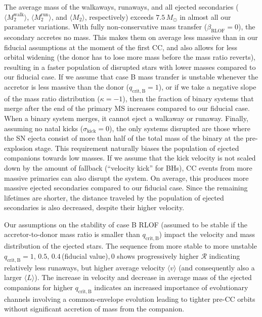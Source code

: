 \documentclass{aa}
\begin{document}
The average mass of the walkaways, runaways, and all ejected
secondaries ($\langle M_2^\mathrm{walk} \rangle$, $\langle
M_2^\mathrm{run} \rangle$, and $\langle M_2 \rangle$, respectively) exceeds $7.5\,M_\odot$ in almost all our parameter variations. With
fully non-conservative mass transfer ($\beta_\mathrm{RLOF}=0$),
the secondary accretes no mass. This makes them on average less
massive than in our fiducial assumptions at the moment of the first CC, and also allows
for less orbital widening (the donor has to lose more mass before the
mass ratio reverts), resulting in a faster population of disrupted
stars with lower masses compared to our fiducial case. If we assume that case B mass transfer is
unstable whenever the accretor is less massive than the donor
($q_\mathrm{crit, B}=1$), or if we take a negative slope of the mass ratio
distribution ($\kappa=-1$), then the fraction of binary systems that
merge after the end of the primary MS increases compared to our
fiducial case. 
When a binary system merges, it cannot eject a walkaway or runaway.
Finally, assuming no natal kicks ($\sigma_\mathrm{kick}=0$), the only
systems disrupted are those where the SN ejecta consist of more than
half of the total mass of the binary at the pre-explosion stage. This
requirement naturally biases the population of ejected companions
towards low masses. If we assume that the kick velocity is not scaled down by the amount
of fallback (``velocity kick'' for BHs), CC events from more massive primaries can also disrupt
the system. On average, this produces more massive ejected
secondaries compared to our fiducial case. Since the remaining lifetimes are shorter, the
distance traveled by the population of ejected secondaries is
also decreased, despite their higher velocity. 

Our assumptions on the stability of case B RLOF (assumed to be stable
if the accretor-to-donor mass ratio is smaller than $q_\mathrm{crit,B}$) impact the
velocity and mass distribution of the ejected stars. The sequence from
more stable to more unstable
$q_\mathrm{crit,B}=1,\,0.5,\,0.4$\,(fiducial
value),\,0 shows progressively higher $\mathcal{R}$ indicating
relatively less runaways, but higher average velocity $\langle v\rangle$ (and
consequently also a larger $\langle L \rangle$). The increase in velocity and
decrease in average mass of the ejected companions for higher
$q_\mathrm{crit,B}$ indicates an increased importance of evolutionary
channels involving a common-envelope evolution leading to tighter
pre-CC orbits without significant accretion of mass from the companion.
\end{document}
